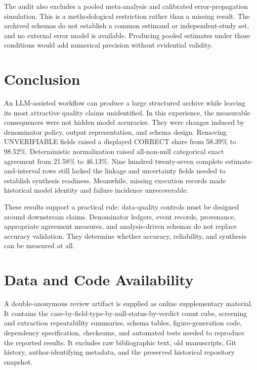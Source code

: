 \documentclass[acmsmall,anonymous,review]{acmart}
\begin{document}
The audit also excludes a pooled meta-analysis and calibrated error-propagation simulation. This is a methodological restriction rather than a missing result. The archived schemas do not establish a common estimand or independent-study set, and no external error model is available. Producing pooled estimates under those conditions would add numerical precision without evidential validity.

\section{Conclusion}

An LLM-assisted workflow can produce a large structured archive while leaving its most attractive quality claims unidentified. In this experience, the measurable consequences were not hidden model accuracies. They were changes induced by denominator policy, output representation, and schema design. Removing UNVERIFIABLE fields raised a displayed CORRECT share from 58.39\% to 98.52\%. Deterministic normalization raised all-non-null categorical exact agreement from 21.58\% to 46.13\%. Nine hundred twenty-seven complete estimate-and-interval rows still lacked the linkage and uncertainty fields needed to establish synthesis readiness. Meanwhile, missing execution records made historical model identity and failure incidence unrecoverable.

These results support a practical rule: data-quality controls must be designed around downstream claims. Denominator ledgers, event records, provenance, appropriate agreement measures, and analysis-driven schemas do not replace accuracy validation. They determine whether accuracy, reliability, and synthesis can be measured at all.

\section*{Data and Code Availability}

A double-anonymous review artifact is supplied as online supplementary material. It contains the case-by-field-type-by-null-status-by-verdict count cube, screening and extraction repeatability summaries, schema tables, figure-generation code, dependency specification, checksums, and automated tests needed to reproduce the reported results. It excludes raw bibliographic text, old manuscripts, Git history, author-identifying metadata, and the preserved historical repository snapshot.



\end{document}
